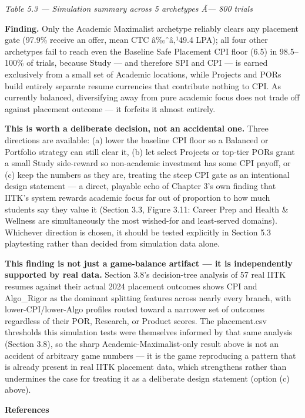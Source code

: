 \emph{Table 5.3 --- Simulation summary across 5 archetypes Ã--- 800 trials}

\textbf{Finding.} Only the Academic Maximalist archetype reliably clears any placement gate (97.9\% receive an offer, mean CTC â‰ˆâ‚¹49.4 LPA); all four other archetypes fail to reach even the Baseline Safe Placement CPI floor (6.5) in 98.5--100\% of trials, because Study --- and therefore SPI and CPI --- is earned exclusively from a small set of Academic locations, while Projects and PORs build entirely separate resume currencies that contribute nothing to CPI. As currently balanced, diversifying away from pure academic focus does not trade off against placement outcome --- it forfeits it almost entirely.

\textbf{This is worth a deliberate decision, not an accidental one.} Three directions are available: (a) lower the baseline CPI floor so a Balanced or Portfolio strategy can still clear it, (b) let select Projects or top-tier PORs grant a small Study side-reward so non-academic investment has some CPI payoff, or (c) keep the numbers as they are, treating the steep CPI gate as an intentional design statement --- a direct, playable echo of Chapter 3's own finding that IITK's system rewards academic focus far out of proportion to how much students say they value it (Section 3.3, Figure 3.11: Career Prep and Health \& Wellness are simultaneously the most wished-for and least-served domains). Whichever direction is chosen, it should be tested explicitly in Section 5.3 playtesting rather than decided from simulation data alone.

\textbf{This finding is not just a game-balance artifact --- it is independently supported by real data.} Section 3.8's decision-tree analysis of 57 real IITK resumes against their actual 2024 placement outcomes shows CPI and Algo_Rigor as the dominant splitting features across nearly every branch, with lower-CPI/lower-Algo profiles routed toward a narrower set of outcomes regardless of their POR, Research, or Product scores. The placement.csv thresholds this simulation tests were themselves informed by that same analysis (Section 3.8), so the sharp Academic-Maximalist-only result above is not an accident of arbitrary game numbers --- it is the game reproducing a pattern that is already present in real IITK placement data, which strengthens rather than undermines the case for treating it as a deliberate design statement (option (c) above).

\textbf{References}


